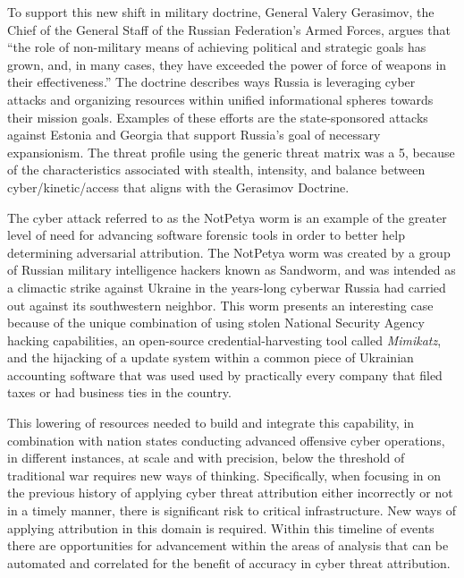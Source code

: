\documentclass[12pt]{report}
\begin{document}
To support this new shift in military doctrine, General Valery Gerasimov, the Chief of the General Staff of the Russian Federation’s Armed Forces, argues that “the role of non-military means of achieving political and strategic goals has grown, and, in many cases, they have exceeded the power of force of weapons in their effectiveness.”  The doctrine describes ways Russia is leveraging cyber attacks and organizing resources within unified informational spheres towards their mission goals.  Examples of these efforts are the state-sponsored attacks against Estonia and Georgia that support Russia’s goal of necessary expansionism.  The threat profile using the generic threat matrix was a 5, because of the characteristics associated with stealth, intensity, and balance between cyber/kinetic/access that aligns with the Gerasimov Doctrine.  

The cyber attack referred to as the NotPetya worm is an example of the greater level of need for advancing software forensic tools in order to better help determining adversarial attribution.  The NotPetya worm was created by a group of Russian military intelligence hackers known as Sandworm, and was intended as a climactic strike against Ukraine in the years-long cyberwar Russia had carried out against its southwestern neighbor.  This worm presents an interesting case because of the unique combination of using stolen National Security Agency hacking capabilities, an open-source credential-harvesting tool called \emph{Mimikatz}, and the hijacking of a update system within a common piece of Ukrainian accounting software that was used used by practically every company that filed taxes or had business ties in the country.  \cite{greenberg2018untold}

This lowering of resources needed to build and integrate this capability, in combination with nation states conducting advanced offensive cyber operations, in different instances, at scale and with precision, below the threshold of traditional war requires new ways of thinking.  Specifically, when focusing in on the previous history of applying cyber threat attribution either incorrectly or not in a timely manner, there is significant risk to critical infrastructure.  New ways of applying attribution in this domain is required.  Within this timeline of events there are opportunities for advancement within the areas of analysis that can be automated and correlated for the benefit of accuracy in cyber threat attribution.  
\end{document}
